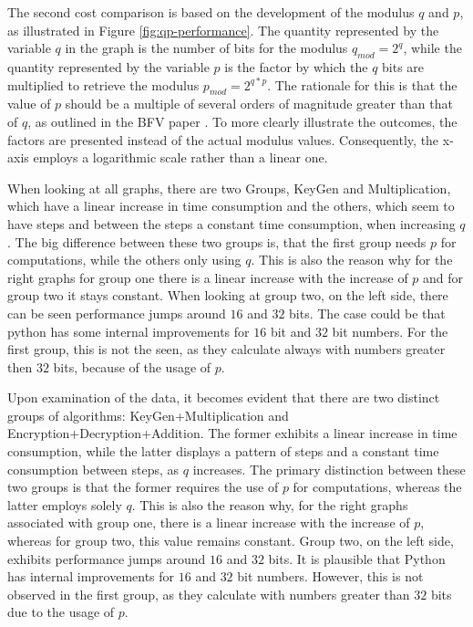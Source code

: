 The second cost comparison is based on the development of the modulus $q$ and $p$, as illustrated in Figure \ref{fig:qp-performance}. 
The quantity represented by the variable $q$ in the graph is the number of bits for the modulus $q_{mod} = 2^q$, while the quantity represented by the variable $p$ is the factor by which the $q$ bits are multiplied to retrieve the modulus $p_{mod} = 2^{q*p}$. The rationale for this is that the value of $p$ should be a multiple of several orders of magnitude greater than that of $q$, as outlined in the BFV paper \cite{bfv}. To more clearly illustrate the outcomes, the factors are presented instead of the actual modulus values. Consequently, the x-axis employs a logarithmic scale rather than a linear one.

When looking at all graphs, there are two Groups, KeyGen and Multiplication, which have a linear increase in time consumption and the others, which seem to have steps and between the steps a constant time consumption, when increasing $q$. The big difference between these two groups is, that the first group needs $p$ for computations, while the others only using $q$.  This is also the reason why for the right graphs for group one there is a linear increase with the increase of $p$ and for group two it stays constant. When looking at group two, on the left side, there can be seen performance jumps around $16$ and $32$ bits. The case could be that python has some internal improvements for $16$ bit and $32$ bit numbers. For the first group, this is not the seen, as they calculate always with numbers greater then $32$ bits, because of the usage of $p$.

Upon examination of the data, it becomes evident that there are two distinct groups of algorithms: KeyGen+Multiplication and Encryption+Decryption+Addition. The former exhibits a linear increase in time consumption, while the latter displays a pattern of steps and a constant time consumption between steps, as $q$ increases. The primary distinction between these two groups is that the former requires the use of $p$ for computations, whereas the latter employs solely $q$.  This is also the reason why, for the right graphs associated with group one, there is a linear increase with the increase of $p$, whereas for group two, this value remains constant. Group two, on the left side, exhibits performance jumps around $16$ and $32$ bits. It is plausible that Python has internal improvements for $16$ and $32$ bit numbers. However, this is not observed in the first group, as they calculate with numbers greater than $32$ bits due to the usage of $p$.

